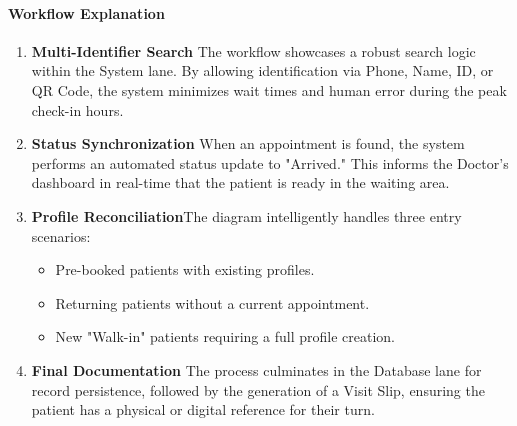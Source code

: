 \paragraph{Workflow Explanation}
	\begin{enumerate}
	\item \textbf{Multi-Identifier Search}
	The workflow showcases a robust search logic within the System lane. By allowing identification via Phone, Name, ID, or QR Code, the system minimizes wait times and human error during the peak check-in hours.
	\item \textbf{Status Synchronization}
	When an appointment is found, the system performs an automated status update to "Arrived." This informs the Doctor’s dashboard in real-time that the patient is ready in the waiting area.
	\item \textbf{Profile Reconciliation}The diagram intelligently handles three entry scenarios:
	\begin{itemize}
		\item Pre-booked patients with existing profiles.
		\item Returning patients without a current appointment.
		\item New "Walk-in" patients requiring a full profile creation.
	\end{itemize}
	\item \textbf{Final Documentation}
	The process culminates in the Database lane for record persistence, followed by the generation of a Visit Slip, ensuring the patient has a physical or digital reference for their turn.
\end{enumerate}
\newpage
